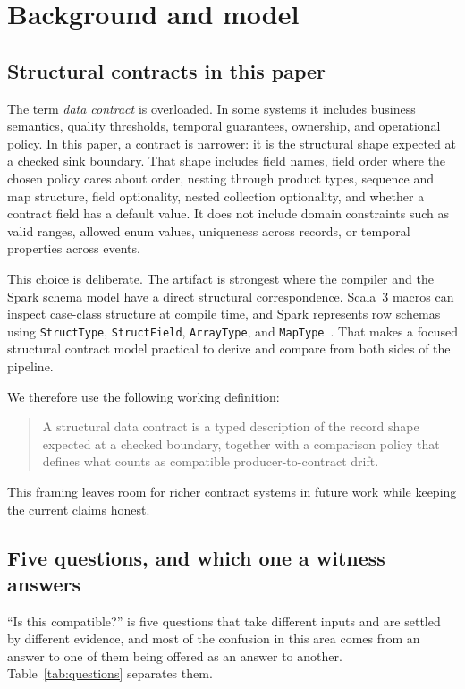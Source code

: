 \section{Background and model}

\subsection{Structural contracts in this paper}

The term \emph{data contract} is overloaded. In some systems it includes business semantics, quality thresholds, temporal guarantees, ownership, and operational policy. In this paper, a contract is narrower: it is the structural shape expected at a checked sink boundary. That shape includes field names, field order where the chosen policy cares about order, nesting through product types, sequence and map structure, field optionality, nested collection optionality, and whether a contract field has a default value. It does not include domain constraints such as valid ranges, allowed enum values, uniqueness across records, or temporal properties across events.

This choice is deliberate. The artifact is strongest where the compiler and the Spark schema model have a direct structural correspondence. Scala~3 macros can inspect case-class structure at compile time, and Spark represents row schemas using \texttt{StructType}, \texttt{StructField}, \texttt{ArrayType}, and \texttt{MapType}~\cite{scala3_reflection,spark_structtype}. That makes a focused structural contract model practical to derive and compare from both sides of the pipeline.

We therefore use the following working definition:

\begin{quote}
A structural data contract is a typed description of the record shape expected at a checked boundary, together with a comparison policy that defines what counts as compatible producer-to-contract drift.
\end{quote}

This framing leaves room for richer contract systems in future work while keeping the current claims honest.

\subsection{Five questions, and which one a witness answers}
\label{sec:five-questions}

``Is this compatible?'' is five questions that take different inputs and are settled by different evidence, and most of the confusion in this area comes from an answer to one of them being offered as an answer to another. Table~\ref{tab:questions} separates them.

